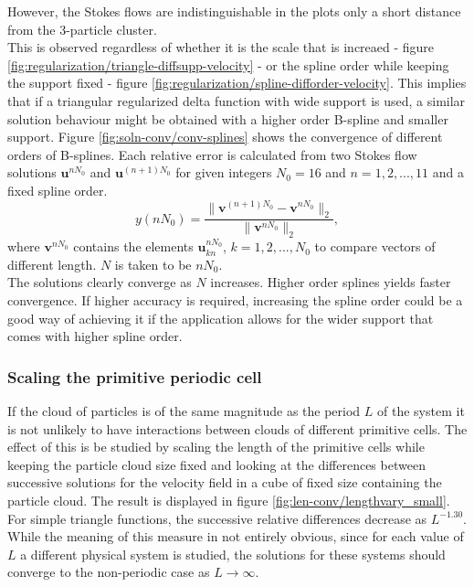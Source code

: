 \documentclass[a4paper,
twoside=false,abstract=false,numbers=noenddot,
titlepage=false,headings=small,parskip=half,version=last]{scrartcl}
\begin{document}
However, the Stokes flows are indistinguishable in the plots only a short distance from the 3-particle cluster.\\
This is observed regardless of whether it is the scale that is increaed - figure \ref{fig:regularization/triangle-diffsupp-velocity} - or the spline order while keeping the support fixed - figure \ref{fig:regularization/spline-difforder-velocity}. This implies that if a triangular regularized delta function with wide support is used, a similar solution behaviour might be obtained with a higher order B-spline and smaller support.
Figure \ref{fig:soln-conv/conv-splines} shows the convergence of different orders of B-splines.
Each relative error is calculated from two Stokes flow solutions $\mathbf{u}^{nN_0}$ and $\mathbf{u}^{(n+1)N_0}$ for given integers $N_0=16$ and $n=1,2,...,11$ and a fixed spline order.
\begin{equation}
y(nN_0) = \frac{\|\mathbf{v}^{(n+1)N_0}-\mathbf{v}^{nN_0}\|_2}{\|\mathbf{v}^{nN_0}\|_2},
\end{equation}
where $\mathbf{v}^{nN_0}$ contains the elements $\mathbf{u}^{nN_0}_{kn}$, $k=1,2,...,N_0$ to compare vectors of different length. $N$ is taken to be $nN_0$.\\
The solutions clearly converge as $N$ increases.
Higher order splines yields faster convergence.
If higher accuracy is required, increasing the spline order could be a good way of achieving it if the application allows for the wider support that comes with higher spline order.
\subsubsection{Scaling the primitive periodic cell}\label{cellscale}
If the cloud of particles is of the same magnitude as the period $L$ of the system it is not unlikely to have interactions between clouds of different primitive cells.
The effect of this is be studied by scaling the length of the primitive cells while keeping the particle cloud size fixed and looking at the differences between successive solutions for the velocity field in a cube of fixed size containing the particle cloud.
The result is displayed in figure \ref{fig:len-conv/lengthvary_small}.
For simple triangle functions, the successive relative differences decrease as $L^{-1.30}$.
While the meaning of this measure in not entirely obvious, since for each value of $L$ a different physical system is studied, the solutions for these systems should converge to the non-periodic case as $L\rightarrow \infty$.
\end{document}
